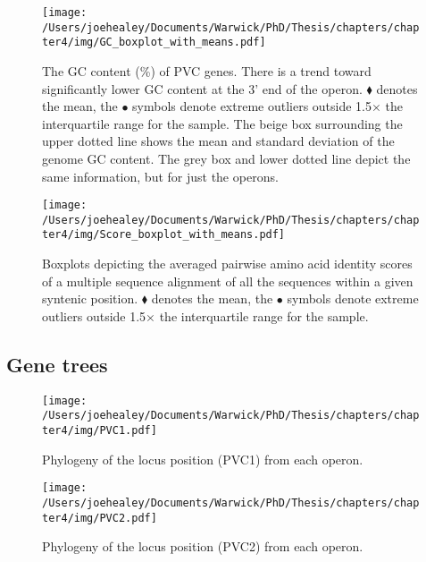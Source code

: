 \newpage
\begin{figure}[h!]
	\centering
	\texttt{[image: /Users/joehealey/Documents/Warwick/PhD/Thesis/chapters/chapter4/img/GC\_boxplot\_with\_means.pdf]}
	\captionsetup{singlelinecheck=off, justification=justified, font=footnotesize, aboveskip=19pt}
	\caption[GC Content of PVC Genes]{The GC content (\%) of PVC genes. There is a trend toward significantly lower GC content at the 3' end of the operon. $\blacklozenge$ denotes the mean, the $\bullet$ symbols denote extreme outliers outside 1.5$\times$ the interquartile range for the sample. The beige box surrounding the upper dotted line shows the mean and standard deviation of the genome GC content. The grey box and lower dotted line depict the same information, but for just the operons.}
	\label{GC}
\end{figure}

\begin{figure}[h!]
	\centering
	\texttt{[image: /Users/joehealey/Documents/Warwick/PhD/Thesis/chapters/chapter4/img/Score\_boxplot\_with\_means.pdf]}
	\captionsetup{singlelinecheck=off, justification=justified, font=footnotesize, aboveskip=19pt}
	\caption[Pairwise Amino Acid Identity Scores for PVC Proteins]{Boxplots depicting the averaged pairwise amino acid identity scores of a multiple sequence alignment of all the sequences within a given syntenic position. $\blacklozenge$ denotes the mean, the $\bullet$ symbols denote extreme outliers outside 1.5$\times$ the interquartile range for the sample.}
	\label{AAID}
\end{figure}


\newpage
\subsection{Gene trees}

\begin{figure}[h!]
	\centering
	\texttt{[image: /Users/joehealey/Documents/Warwick/PhD/Thesis/chapters/chapter4/img/PVC1.pdf]}
	\captionsetup{singlelinecheck=off, justification=justified, font=footnotesize, aboveskip=19pt}
	\caption{Phylogeny of the locus position (PVC1) from each operon.}
	\label{pvc1tree}
\end{figure}
\hfill
\begin{figure}[h!]
	\centering
	\texttt{[image: /Users/joehealey/Documents/Warwick/PhD/Thesis/chapters/chapter4/img/PVC2.pdf]}
	\captionsetup{singlelinecheck=off, justification=justified, font=footnotesize, aboveskip=19pt}
	\caption{Phylogeny of the locus position (PVC2) from each operon.}
	\label{pvc1tree}
\end{figure}

